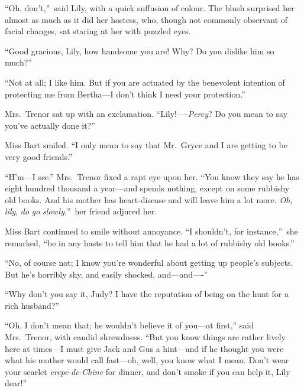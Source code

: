 \documentclass[12pt,a4paper]{book}
\begin{document}
``Oh, don't,''\ said Lily, with a quick suffusion of colour. The
blush surprised her almost as much as it did her hostess, who,
though not commonly observant of facial changes, sat staring at
her with puzzled eyes.





``Good gracious, Lily, how handsome you are! Why? Do you dislike
him so much?''





``Not at all; I like him. But if you are actuated by the
benevolent intention of protecting me from Bertha---I don't think
I need your protection.''





Mrs.\ Trenor sat up with an exclamation. ``Lily!----\textit{Percy}? Do you
mean to say you've actually done it?''





Miss Bart smiled. ``I only mean to say that Mr.\ Gryce and I are
getting to be very good friends.''





``H'm---I see.'' Mrs.\ Trenor fixed a rapt eye upon her. ``You know
they say he has eight hundred thousand a year---and spends
nothing, except on some rubbishy old books. And his mother has
heart-disease and will leave him a lot more. \textit{Oh}, \textit{lily}, \textit{do} \textit{go}
\textit{slowly},''\ her friend adjured her.





Miss Bart continued to smile without annoyance. ``I shouldn't, for
instance,''\ she remarked, ``be in any haste to tell him that he had
a lot of rubbishy old books.''





``No, of course not; I know you're wonderful about getting up
people's subjects. But he's horribly shy, and easily shocked,
and---and----''





``Why don't you say it, Judy? I have the reputation of being on
the hunt for a rich husband?''





``Oh, I don't mean that; he wouldn't believe it of you---at first,''
said Mrs.\ Trenor, with candid shrewdness. ``But you know things
are rather lively here at times---I must give Jack and Gus a
hint---and if he thought you were what his mother would call
fast---oh, well, you know what I mean. Don't wear your scarlet
\textit{crepe}-\textit{de}-\textit{Chine} for dinner, and don't smoke if you can help it,
Lily dear!''
\end{document}
